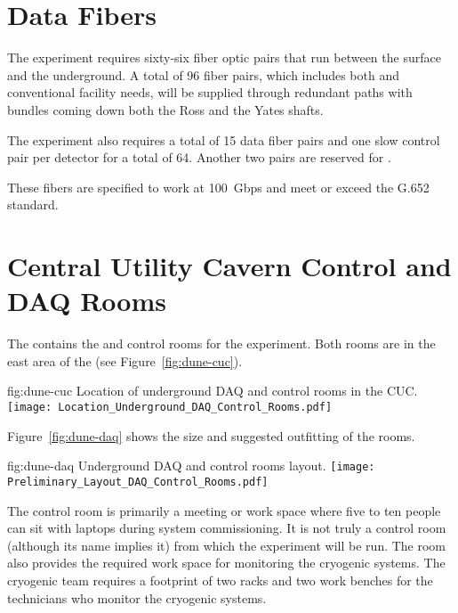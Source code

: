 \section{Data Fibers}
\label{sec:fdsp-coord-faci-fibers}


The  experiment requires sixty-six fiber
optic pairs that run between the surface and the underground.  A
total of 96 fiber pairs, which includes both  and conventional
facility needs, will be supplied through redundant paths with bundles
coming down both the Ross and the Yates shafts.


The experiment also requires a total of 15 data fiber pairs and
one slow control pair per detector for a total of 64.  Another
two pairs are reserved for .


These fibers are specified to work at 100~Gbps and meet or exceed the
G.652 standard.


\section{Central Utility Cavern Control and DAQ Rooms}
\label{sec:fdsp-coord-cuc-daq}


The  contains the  and control
rooms for the  experiment.  Both rooms are in the east
area of the  (see Figure~\ref{fig:dune-cuc}).  
\begin{dunefigure}{fig:dune-cuc}
  {Location of underground DAQ and control rooms in the CUC.}
  \texttt{[image: Location\_Underground\_DAQ\_Control\_Rooms.pdf]}
\end{dunefigure}
Figure~\ref{fig:dune-daq} shows the size and suggested outfitting of the rooms.
\begin{dunefigure}{fig:dune-daq}
  {Underground DAQ and control rooms layout.}
  \texttt{[image: Preliminary\_Layout\_DAQ\_Control\_Rooms.pdf]}
\end{dunefigure}


The control room is primarily a meeting or work space where
five to ten people can sit with laptops during system commissioning.
It is not truly a control room (although its name implies it) from which the
experiment will be run.  The room also provides the required work space for
monitoring the cryogenic systems.  The cryogenic team requires a
footprint of two racks and two work benches for the technicians who monitor the cryogenic systems.
       
